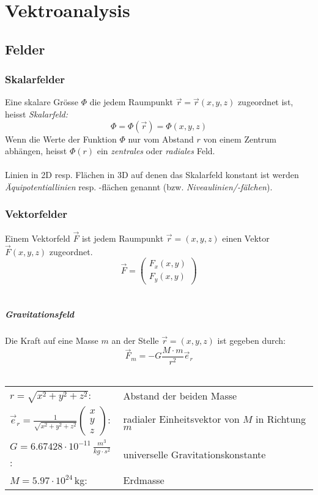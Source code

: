\chapter{Vektroanalysis}
\section{Felder}
\subsection{Skalarfelder}
Eine skalare Grösse $\Phi$ die jedem Raumpunkt $\vec{r}=\vec{r}(x,y,z)$
zugeordnet ist, heisst \textit{Skalarfeld:}
\[ \Phi = \Phi(\vec{r}) = \Phi(x,y,z) \]
Wenn die Werte der Funktion $\Phi$ nur vom Abstand $r$ von einem Zentrum abhängen,
heisst $\Phi(r)$ ein \textit{zentrales} oder \textit{radiales} Feld.\\
\\
Linien in 2D resp. Flächen in 3D auf denen das Skalarfeld konstant ist werden
\textit{Äquipotentiallinien} resp. -flächen genannt (bzw. \textit{Niveaulinien/-fälchen}).

\subsection{Vektorfelder}
Einem Vektorfeld $\vec{F}$ ist jedem Raumpunkt $\vec{r}=(x,y,z)$ einen Vektor
$\vec{F}(x,y,z)$ zugeordnet.
\[ \vec{F} = \begin{pmatrix} F_x(x,y) \\ F_y(x,y) \end{pmatrix} \]
~\\
\paragraph{Gravitationsfeld}
Die Kraft auf eine Masse $m$ an der Stelle $\vec{r}=(x,y,z)$ ist gegeben durch:
\[ \vec{F}_m = -G\frac{M\cdot m}{r^2} \vec{e}_r \]
~\\
\begin{footnotesize}
\begin{tabular}{ll}
	$r=\sqrt{x^2+y^2+z^2}$:		& Abstand der beiden Masse\\
	$\vec{e}_r=\frac{1}{\sqrt{x^2+y^2+z^2}}\begin{pmatrix}x\\y\\z\end{pmatrix}$:
	& radialer Einheitsvektor von $M$ in Richtung $m$	\\
	$G=6.67428\cdot 10^{-11}\,{\frac{m^3}{kg\cdot s^2}}$:	& universelle Gravitationskonstante\\
	$M=5.97\cdot 10^{24}\,$kg:	&	Erdmasse
\end{tabular}
\end{footnotesize}

